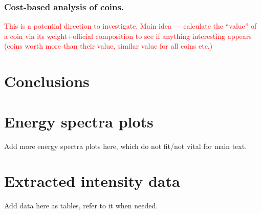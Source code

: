 \documentclass[11pt,a4paper,twoside,onecolumn]{article}
\newcommand{\reminder}[1]{\textcolor{red}{#1}}
\begin{document}
\subsubsection{Cost-based analysis of coins.}
\reminder{This is a potential direction to investigate. Main idea --- calculate the ``value'' of a coin via its weight+official composition to see if anything interesting appears (coins worth more than their value, similar value for all coins etc.)}

\section{Conclusions}
\lipsum[1-5]

\newpage
\appendix
\section{Energy spectra plots}
Add more energy spectra plots here, which do not fit/not vital for main text.

\section{Extracted intensity data}
Add data here as tables, refer to it when needed.
\end{document}
